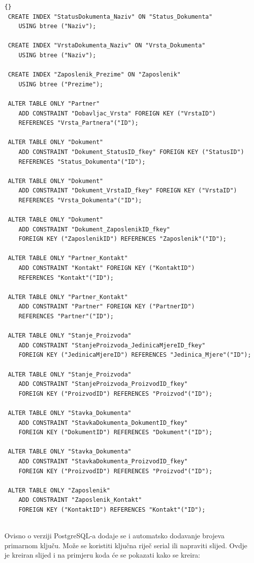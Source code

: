 \documentclass[a4paper,12pt]{foi}
\begin{document}
\begin{lstlisting}[frame=tb]{}
 CREATE INDEX "StatusDokumenta_Naziv" ON "Status_Dokumenta" 
 	USING btree ("Naziv");

 CREATE INDEX "VrstaDokumenta_Naziv" ON "Vrsta_Dokumenta" 
 	USING btree ("Naziv");

 CREATE INDEX "Zaposlenik_Prezime" ON "Zaposlenik" 
 	USING btree ("Prezime"); 	

 ALTER TABLE ONLY "Partner"
    ADD CONSTRAINT "Dobavljac_Vrsta" FOREIGN KEY ("VrstaID") 
    REFERENCES "Vrsta_Partnera"("ID");

 ALTER TABLE ONLY "Dokument"
    ADD CONSTRAINT "Dokument_StatusID_fkey" FOREIGN KEY ("StatusID") 
    REFERENCES "Status_Dokumenta"("ID");

 ALTER TABLE ONLY "Dokument"
    ADD CONSTRAINT "Dokument_VrstaID_fkey" FOREIGN KEY ("VrstaID") 
    REFERENCES "Vrsta_Dokumenta"("ID");

 ALTER TABLE ONLY "Dokument"
    ADD CONSTRAINT "Dokument_ZaposlenikID_fkey" 
    FOREIGN KEY ("ZaposlenikID") REFERENCES "Zaposlenik"("ID");

 ALTER TABLE ONLY "Partner_Kontakt"
    ADD CONSTRAINT "Kontakt" FOREIGN KEY ("KontaktID") 
    REFERENCES "Kontakt"("ID");

 ALTER TABLE ONLY "Partner_Kontakt"
    ADD CONSTRAINT "Partner" FOREIGN KEY ("PartnerID") 
    REFERENCES "Partner"("ID");

 ALTER TABLE ONLY "Stanje_Proizvoda"
    ADD CONSTRAINT "StanjeProizvoda_JedinicaMjereID_fkey" 
    FOREIGN KEY ("JedinicaMjereID") REFERENCES "Jedinica_Mjere"("ID");

 ALTER TABLE ONLY "Stanje_Proizvoda"
    ADD CONSTRAINT "StanjeProizvoda_ProizvodID_fkey" 
    FOREIGN KEY ("ProizvodID") REFERENCES "Proizvod"("ID");

 ALTER TABLE ONLY "Stavka_Dokumenta"
    ADD CONSTRAINT "StavkaDokumenta_DokumentID_fkey" 
    FOREIGN KEY ("DokumentID") REFERENCES "Dokument"("ID");

 ALTER TABLE ONLY "Stavka_Dokumenta"
    ADD CONSTRAINT "StavkaDokumenta_ProizvodID_fkey" 
    FOREIGN KEY ("ProizvodID") REFERENCES "Proizvod"("ID");

 ALTER TABLE ONLY "Zaposlenik"
    ADD CONSTRAINT "Zaposlenik_Kontakt" 
    FOREIGN KEY ("KontaktID") REFERENCES "Kontakt"("ID");
    
\end{lstlisting}

Ovisno o verziji PostgreSQL-a dodaje se i automatsko dodavanje brojeva primarnom ključu. Može se koristiti ključna riječ serial ili napraviti slijed. Ovdje je kreiran slijed i na primjeru koda će se pokazati kako se kreira:
\end{document}

